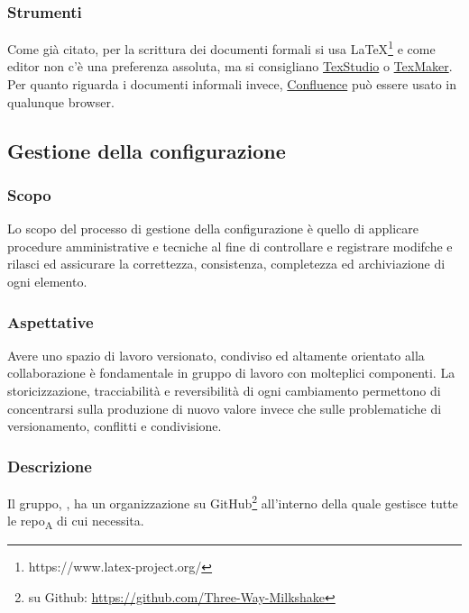     \subsubsection{Strumenti}
    Come già citato, per la scrittura dei documenti formali si usa \LaTeX\footnote{https://www.latex-project.org/} e come editor non c'è una preferenza assoluta, ma si consigliano \href{http://www.texstudio.org/}{TexStudio} o \href{https://www.xm1math.net/texmaker/}{TexMaker}. Per quanto riguarda i documenti informali invece, \href{https://www.atlassian.com/software/confluence}{Confluence} può essere usato in qualunque browser.

\subsection{Gestione della configurazione}
    \subsubsection{Scopo}
        Lo scopo del processo di gestione della configurazione è quello di applicare procedure amministrative e tecniche al fine di controllare e registrare modifche e rilasci ed assicurare la correttezza, consistenza, completezza ed archiviazione di ogni elemento.
    \subsubsection{Aspettative}
        Avere uno spazio di lavoro versionato, condiviso ed altamente orientato alla collaborazione è fondamentale in gruppo di lavoro con molteplici componenti. La storicizzazione, tracciabilità e reversibilità di ogni cambiamento permettono di concentrarsi sulla produzione di nuovo valore invece che sulle problematiche di versionamento, conflitti e condivisione.
    \subsubsection{Descrizione}
        Il gruppo, \group, ha un organizzazione su GitHub\footnote{\group su Github: \url{https://github.com/Three-Way-Milkshake}} all'interno della quale gestisce tutte le repo\textsubscript{A} di cui necessita.
